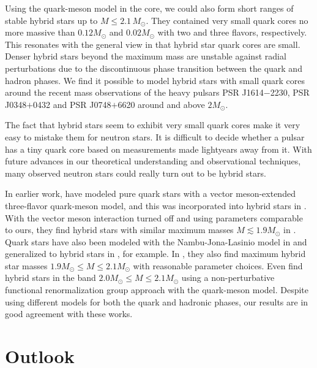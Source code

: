Using the quark-meson model in the core, we could also form short ranges of stable hybrid stars up to $M \leq 2.1 \, M_\odot$.
They contained very small quark cores no more massive than $0.12 M_\odot$ and $0.02 M_\odot$ with two and three flavors, respectively.
This resonates with the general view in \cite{ref:quark_star_review} that hybrid star quark cores are small.
Denser hybrid stars beyond the maximum mass are unstable against radial perturbations due to the discontinuous phase transition between the quark and hadron phases.
We find it possible to model hybrid stars with small quark cores around the recent mass observations \cite{ref:antoniadis,ref:arzoumanian,ref:fonseca}
of the heavy pulsars PSR J1614$-$2230, PSR J0348$+$0432 and PSR J0748$+$6620 around and above $2 M_\odot$.

The fact that hybrid stars seem to exhibit very small quark cores
make it very easy to mistake them for neutron stars.
It is difficult to decide whether a pulsar has a tiny quark core based on measurements made lightyears away from it.
With future advances in our theoretical understanding and observational techniques,
many observed neutron stars could really turn out to be hybrid stars.

In earlier work, \cite{ref:lsm3f_compact_stars} have modeled pure quark stars with a vector meson-extended three-flavor quark-meson model,
and this was incorporated into hybrid stars in \cite{ref:lsm3f_hybrid_stars}.
With the vector meson interaction turned off and using parameters comparable to ours,
they find hybrid stars with similar maximum masses $M \lesssim 1.9 M_\odot$ in \cite[figure 8]{ref:lsm3f_hybrid_stars}. %
Quark stars have also been modeled with the Nambu-Jona-Lasinio model in \cite{ref:quark_star_njl} and generalized to hybrid stars in \cite{ref:hybrid_stars_njl}, for example.
In \cite[figure 3]{ref:hybrid_stars_njl}, they also find maximum hybrid star masses $1.9 M_\odot \leq M \leq 2.1 M_\odot$ with reasonable parameter choices.
Even \cite{ref:quark_hybrid_additional_ref} find hybrid stars in the band $2.0 M_\odot \leq M \leq 2.1 M_\odot$
using a non-perturbative functional renormalization group approach with the quark-meson model.
Despite using different models for both the quark and hadronic phases,
our results are in good agreement with these works.

\section{Outlook}

